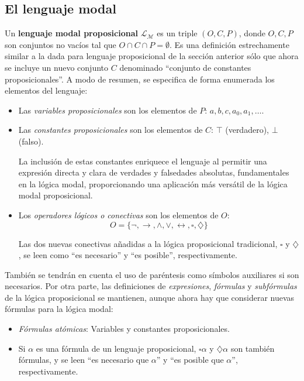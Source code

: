 \subsection{El lenguaje modal}\label{subsection:lmodallanguage}
Un \textbf{lenguaje modal proposicional} $\mathcal{L}_{\mathcal{M}}$ es un triple $(O,C,P)$, donde $O,C,P$ son conjuntos no vacíos tal que $O \cap C \cap P = \emptyset$. Es una definición estrechamente similar a la dada para lenguaje proposicional de la sección anterior sólo que ahora se incluye un nuevo conjunto $C$ denominado ``conjunto de constantes proposicionales''. A modo de resumen, se especifica de forma enumerada los elementos del lenguaje:

\begin{itemize}
    \item Las \textit{variables proposicionales} son los elementos de $P$: $a,b,c,a_0,a_1,\ldots$.
    \item Las \textit{constantes proposicionales} son los elementos de $C$: $\top$ (verdadero), $\bot$ (falso).

    La inclusión de estas constantes enriquece el lenguaje al permitir una expresión directa y clara de verdades y falsedades absolutas, fundamentales en la lógica modal, proporcionando una aplicación más versátil de la lógica modal proposicional.
    
    \item Los \textit{operadores lógicos o conectivas} son los elementos de $O$:
    $$
    O = \lbrace \neg, \rightarrow, \land, \lor, \leftrightarrow, \square, \diamondsuit \rbrace
    $$

    Las dos nuevas conectivas añadidas a la lógica proposicional tradicional, $\square$ y $\diamondsuit$, se leen como ``es necesario'' y ``es posible'', respectivamente.
\end{itemize}

También se tendrán en cuenta el uso de paréntesis como símbolos auxiliares si son necesarios. Por otra parte, las definiciones de \textit{expresiones}, \textit{fórmulas} y \textit{subfórmulas} de la lógica proposicional se mantienen, aunque ahora hay que considerar nuevas fórmulas para la lógica modal:

\begin{itemize}
    \item \textit{Fórmulas atómicas}: Variables y constantes proposicionales.
    \item Si $\alpha$ es una fórmula de un lenguaje proposicional, $\square \alpha$ y $\diamondsuit \alpha$ son también fórmulas, y se leen ``es necesario que $\alpha$'' y ``es posible que $\alpha$'', respectivamente.
\end{itemize}

